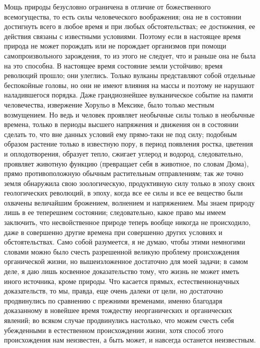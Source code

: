 \documentclass[12pt]{article}
\begin{document}
Мощь природы безусловно ограничена в отличие от божественного всемогущества, то есть силы человеческого воображения; она не в состоянии достигнуть всего в любое время и при любых обстоятельствах; ее достижения, ее действия связаны с известными условиями. Поэтому если в настоящее время природа не может порождать или не порождает организмов при помощи самопроизвольного зарождения, то из этого не следует, что и раньше она не была на это способна. В настоящее время состояние земли устойчиво; время революций прошло; они улеглись. Только вулканы представляют собой отдельные беспокойные головы, но они не имеют влияния на массы и поэтому не нарушают наладившегося порядка. Даже грандиознейшее вулканическое событие на памяти человечества, извержение Хорульо в Мексике, было только местным возмущением. Но ведь и человек проявляет необычные силы только в необычные времена, только в периоды высшего напряжения и движения он в состоянии сделать то, что вне данных условий ему прямо-таки не под силу; подобным образом растение только в известную пору, в период появления ростка, цветения и оплодотворения, образует тепло, сжигает углерод и водород, следовательно, проявляет животную функцию (превращает себя в животное, по словам Дюма), прямо противоположную обычным растительным отправлениям; так же точно земля обнаружила свою зоологическую, продуктивную силу только в эпоху своих геологических революций, в эпоху, когда все ее силы и все ее вещество были охвачены величайшим брожением, волнением и напряжением. Мы знаем природу лишь в ее теперешнем состоянии; следовательно, какое право мы имеем заключить, что несвойственное природе теперь вообще никогда не происходило, даже в совершенно другие времена при совершенно других условиях и обстоятельствах. Само собой разумеется, я не думаю, чтобы этими немногими словами можно было счесть разрешенной великую проблему происхождения органической жизни, но вышеизложенное достаточно для моей задачи; в самом деле, я даю лишь косвенное доказательство тому, что жизнь не может иметь иного источника, кроме природы. Что касается прямых, естественнонаучных доказательств, то мы, правда, еще очень далеки от цели, но достаточно продвинулись по сравнению с прежними временами, именно благодаря доказанному в новейшее время тождеству неорганических и органических явлений; во всяком случае продвинулись настолько, что можем счесть себя убежденными в естественном происхождении жизни, хотя способ этого происхождения нам неизвестен, а быть может, и навсегда останется неизвестным.
\end{document}
